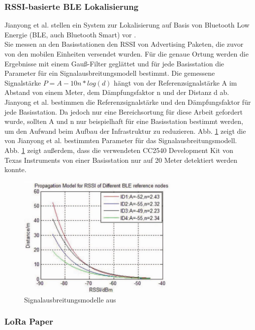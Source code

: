 \subsubsection{RSSI-basierte BLE Lokalisierung}
Jianyong et al. stellen ein System zur Lokalisierung auf Basis von Bluetooth Low Energie (BLE, auch Bluetooth Smart) vor \cite{jianyong2014rssi}. \\
Sie messen an den Basisstationen den RSSI von Advertising Paketen, die zuvor von den mobilen Einheiten versendet wurden.
Für die genaue Ortung werden die Ergebnisse mit einem Gauß-Filter geglättet und für jede Basisstation die Parameter für ein Signalausbreitungsmodell bestimmt.
Die gemessene Signalstärke $P = A - 10n*log(d)$ hängt von der Referenzsignalstärke A im Abstand von einem Meter, dem Dämpfungsfaktor n und der Distanz d ab. \\
Jianyong et al. bestimmen die Referenzsignalstärke und den Dämpfungsfaktor für jede Basisstation.
Da jedoch nur eine Bereichsortung für diese Arbeit gefordert wurde, sollten A und n nur beispielhaft für eine Basisstation bestimmt werden, um den Aufwand beim Aufbau der Infrastruktur zu reduzieren.
Abb. \ref{fig:blemodel} zeigt die von Jianyong et al. bestimmten Parameter für das Signalausbreitungsmodell. 
Abb. \ref{fig:blemodel} zeigt außerdem, dass die verwendeten CC2540 Development Kit von Texas Instruments von einer Basisstation nur auf 20 Meter detektiert werden konnte.


\begin{figure}[h]
  \centering
	\includegraphics[width=0.7\textwidth]{images/blemodel.png}
  \caption{Signalausbreitungsmodelle aus \cite{jianyong2014rssi}}
  \label{fig:blemodel}
\end{figure}

\subsubsection{LoRa Paper}

